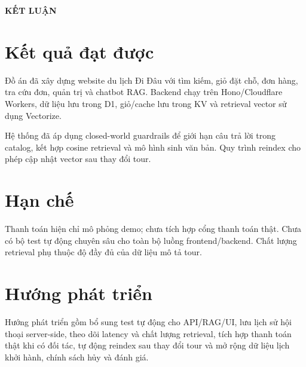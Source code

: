 \begin{center}
\large {\textbf{KẾT LUẬN}}
\end{center}

\section*{Kết quả đạt được}
Đồ án đã xây dựng website du lịch Đi Đâu với tìm kiếm, giỏ đặt chỗ, đơn hàng, tra cứu đơn, quản trị và chatbot RAG. Backend chạy trên Hono/Cloudflare Workers, dữ liệu lưu trong D1, giỏ/cache lưu trong KV và retrieval vector sử dụng Vectorize.

Hệ thống đã áp dụng closed-world guardrails để giới hạn câu trả lời trong catalog, kết hợp cosine retrieval và mô hình sinh văn bản. Quy trình reindex cho phép cập nhật vector sau thay đổi tour.

\section*{Hạn chế}
Thanh toán hiện chỉ mô phỏng demo; chưa tích hợp cổng thanh toán thật. Chưa có bộ test tự động chuyên sâu cho toàn bộ luồng frontend/backend. Chất lượng retrieval phụ thuộc độ đầy đủ của dữ liệu mô tả tour.

\section*{Hướng phát triển}
Hướng phát triển gồm bổ sung test tự động cho API/RAG/UI, lưu lịch sử hội thoại server-side, theo dõi latency và chất lượng retrieval, tích hợp thanh toán thật khi có đối tác, tự động reindex sau thay đổi tour và mở rộng dữ liệu lịch khởi hành, chính sách hủy và đánh giá.
